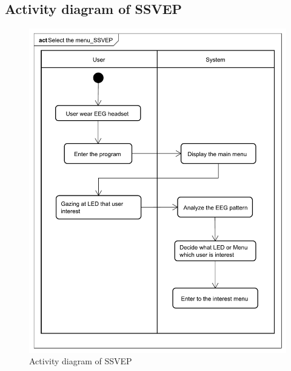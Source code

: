 \subsection{Activity diagram of SSVEP}
\begin{figure}[ht]
	\centering
	\includegraphics[scale = 0.3]{chapter4/av_SSVEP.pdf}
	\caption{Activity diagram of SSVEP}
\end{figure}